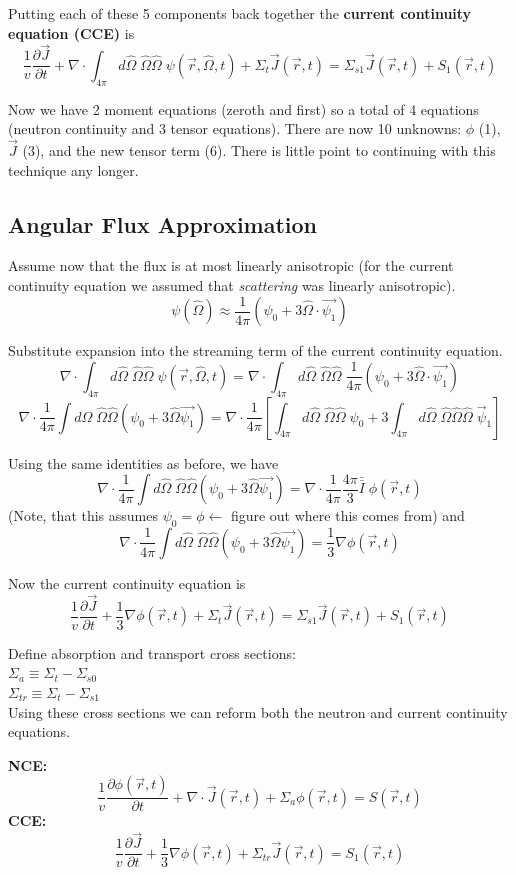\documentclass{report}
\newcommand{\hh}[1]{\subsection*{#1}}
\newcommand{\p}{\partial}
\newcommand{\Xs}{\Sigma}
\newcommand{\Oov}{\frac{1}{v}}
\newcommand{\pos}{\vec{r}}
\newcommand{\cur}{\vec{J}}
\newcommand{\Oh}{\hat{\Omega}}
\newcommand{\intfp}{\int_{4\pi}}
\newcommand{\rt}{(\pos,t)}
\newcommand{\rOt}{(\pos,\Oh,t)}
\begin{document}
Putting each of these 5 components back together the \textbf{current continuity equation (CCE)} is
$$\Oov \frac{\p \cur}{\p t} + \nabla \cdot \intfp d\Oh \;\Oh\Oh \; \psi\rOt + \Xs_t \cur\rt = \Xs_{s1}\cur\rt + S_1\rt$$

Now we have 2 moment equations (zeroth and first) so a total of 4 equations (neutron continuity and 3 tensor equations). There are now 10 unknowns: $\phi$ (1), $\cur$ (3), and the new tensor term (6). There is little point to continuing with this technique any longer.


\hh{Angular Flux Approximation}

Assume now that the flux is at most linearly anisotropic (for the current continuity equation we assumed that \textit{scattering} was linearly anisotropic).
$$ \psi(\Oh) \approx \frac{1}{4\pi}\left(\psi_0 + 3\Oh \cdot \vec{\psi_1}\right)$$

Substitute expansion into the streaming term of the current continuity equation.
$$\nabla \cdot \intfp d\Oh \;\Oh\Oh \; \psi\rOt = \nabla \cdot \intfp d\Oh \;\Oh\Oh \; \frac{1}{4\pi}\left(\psi_0 + 3\Oh \cdot \vec{\psi_1}\right)$$
$$ \nabla \cdot \frac{1}{4\pi} \int d\Oh \; \Oh\Oh \left(\psi_0 + 3 \Oh \vec{\psi_1}\right) = \nabla \cdot \frac{1}{4\pi} \left[ \intfp d\Oh \; \Oh\Oh \; \psi_0 + 3 \intfp d\Oh \; \Oh\Oh\Oh \; \vec{\psi}_1 \right] $$

Using the same identities as before, we have
$$ \nabla \cdot \frac{1}{4\pi} \int d\Oh \; \Oh\Oh \left(\psi_0 + 3 \Oh \vec{\psi_1}\right) = \nabla \cdot \frac{1}{4\pi} \frac{4\pi}{3}\bar{\bar{I}} \; \phi\rt $$
(Note, that this assumes $\psi_0 = \phi \leftarrow$ figure out where this comes from)
and
$$ \nabla \cdot \frac{1}{4\pi} \int d\Oh \; \Oh\Oh \left(\psi_0 + 3 \Oh \vec{\psi_1}\right) = \frac{1}{3} \nabla \phi\rt $$

Now the current continuity equation is 
$$\Oov \frac{\p \cur}{\p t} + \frac{1}{3} \nabla \phi\rt + \Xs_t \cur\rt = \Xs_{s1}\cur\rt + S_1\rt$$

Define absorption and transport cross sections:\\
$\Xs_a \equiv \Xs_t - \Xs_{s0}$\\
$\Xs_{tr} \equiv \Xs_t - \Xs_{s1}$\\

Using these cross sections we can reform both the neutron and current continuity equations.

\textbf{NCE:}
$$ \Oov \frac{\p \phi\rt}{\p t} + \nabla \cdot \cur\rt + \Xs_a \phi\rt = S\rt $$
\textbf{CCE:}
$$\Oov \frac{\p \cur}{\p t} + \frac{1}{3} \nabla \phi\rt + \Xs_{tr} \cur\rt = S_1\rt$$
\end{document}
